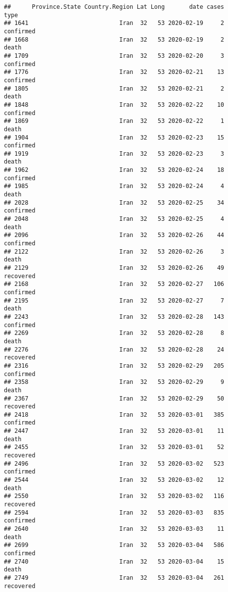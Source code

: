 \documentclass[
]{article}
\newenvironment{Shaded}{\begin{snugshade}}{\end{snugshade}}
\newcommand{\NormalTok}[1]{#1}
\newcommand{\OperatorTok}[1]{\textcolor[rgb]{0.81,0.36,0.00}{\textbf{#1}}}
\newcommand{\StringTok}[1]{\textcolor[rgb]{0.31,0.60,0.02}{#1}}
\begin{document}
\begin{Shaded}
\end{Shaded}

\begin{verbatim}
##      Province.State Country.Region Lat Long       date cases      type
## 1641                          Iran  32   53 2020-02-19     2 confirmed
## 1668                          Iran  32   53 2020-02-19     2     death
## 1709                          Iran  32   53 2020-02-20     3 confirmed
## 1776                          Iran  32   53 2020-02-21    13 confirmed
## 1805                          Iran  32   53 2020-02-21     2     death
## 1848                          Iran  32   53 2020-02-22    10 confirmed
## 1869                          Iran  32   53 2020-02-22     1     death
## 1904                          Iran  32   53 2020-02-23    15 confirmed
## 1919                          Iran  32   53 2020-02-23     3     death
## 1962                          Iran  32   53 2020-02-24    18 confirmed
## 1985                          Iran  32   53 2020-02-24     4     death
## 2028                          Iran  32   53 2020-02-25    34 confirmed
## 2048                          Iran  32   53 2020-02-25     4     death
## 2096                          Iran  32   53 2020-02-26    44 confirmed
## 2122                          Iran  32   53 2020-02-26     3     death
## 2129                          Iran  32   53 2020-02-26    49 recovered
## 2168                          Iran  32   53 2020-02-27   106 confirmed
## 2195                          Iran  32   53 2020-02-27     7     death
## 2243                          Iran  32   53 2020-02-28   143 confirmed
## 2269                          Iran  32   53 2020-02-28     8     death
## 2276                          Iran  32   53 2020-02-28    24 recovered
## 2316                          Iran  32   53 2020-02-29   205 confirmed
## 2358                          Iran  32   53 2020-02-29     9     death
## 2367                          Iran  32   53 2020-02-29    50 recovered
## 2418                          Iran  32   53 2020-03-01   385 confirmed
## 2447                          Iran  32   53 2020-03-01    11     death
## 2455                          Iran  32   53 2020-03-01    52 recovered
## 2496                          Iran  32   53 2020-03-02   523 confirmed
## 2544                          Iran  32   53 2020-03-02    12     death
## 2550                          Iran  32   53 2020-03-02   116 recovered
## 2594                          Iran  32   53 2020-03-03   835 confirmed
## 2640                          Iran  32   53 2020-03-03    11     death
## 2699                          Iran  32   53 2020-03-04   586 confirmed
## 2740                          Iran  32   53 2020-03-04    15     death
## 2749                          Iran  32   53 2020-03-04   261 recovered
\end{verbatim}
\end{document}
